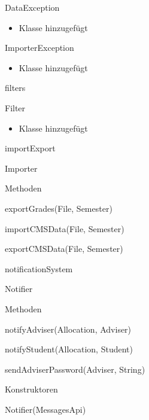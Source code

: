 \documentclass[parskip=full]{scrartcl}
\begin{document}
\begin{itemPackage}
\begin{itemClass}
\item DataException
\begin{itemize}
	  \item Klasse hinzugefügt
	\end{itemize}
\item ImporterException
\begin{itemize}
	  \item Klasse hinzugefügt
	\end{itemize}
\end{itemClass}
\item filters
\begin{itemClass}
\item Filter
\begin{itemize}
	  \item Klasse hinzugefügt
	\end{itemize}
\end{itemClass}
\item importExport
\begin{itemClass}
\item Importer
\begin{itemClassSub}
\item Methoden
\begin{itemPlus}
\item exportGrades(File, Semester)
\end{itemPlus}
\begin{itemMinus}
\item importCMSData(File, Semester)
\item exportCMSData(File, Semester)
\end{itemMinus}
\end{itemClassSub}
\end{itemClass}
\item notificationSystem
\begin{itemClass}
\item Notifier
\begin{itemClassSub}
\item Methoden
\begin{itemPlus}
\item notifyAdviser(Allocation, Adviser)
\item notifyStudent(Allocation, Student)
\item sendAdviserPassword(Adviser, String)
\end{itemPlus}
\item Konstruktoren
\begin{itemPlus}
\item Notifier(MessagesApi)

\end{itemPlus}
\end{itemClassSub}
\end{itemClass}
\end{itemPackage}
\end{document}
